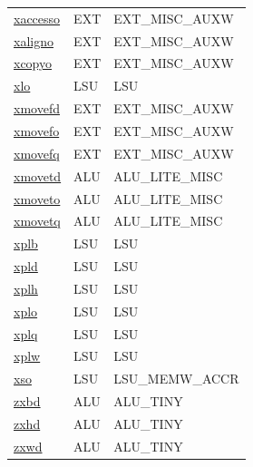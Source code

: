 \begin{small}
\begin{longtable}[l]{l l l}
\hyperlink{lvx.xaccesso}{xaccesso} & EXT & EXT\_MISC\_AUXW \\ 
\hyperlink{lvx.xaligno}{xaligno} & EXT & EXT\_MISC\_AUXW \\ 
\hyperlink{lvx.xcopyo}{xcopyo} & EXT & EXT\_MISC\_AUXW \\ 
\hyperlink{lvx.xlo}{xlo} & LSU & LSU \\ 
\hyperlink{lvx.xmovefd}{xmovefd} & EXT & EXT\_MISC\_AUXW \\ 
\hyperlink{lvx.xmovefo}{xmovefo} & EXT & EXT\_MISC\_AUXW \\ 
\hyperlink{lvx.xmovefq}{xmovefq} & EXT & EXT\_MISC\_AUXW \\ 
\hyperlink{lvx.xmovetd}{xmovetd} & ALU & ALU\_LITE\_MISC \\ 
\hyperlink{lvx.xmoveto}{xmoveto} & ALU & ALU\_LITE\_MISC \\ 
\hyperlink{lvx.xmovetq}{xmovetq} & ALU & ALU\_LITE\_MISC \\ 
\hyperlink{lvx.xplb}{xplb} & LSU & LSU \\ 
\hyperlink{lvx.xpld}{xpld} & LSU & LSU \\ 
\hyperlink{lvx.xplh}{xplh} & LSU & LSU \\ 
\hyperlink{lvx.xplo}{xplo} & LSU & LSU \\ 
\hyperlink{lvx.xplq}{xplq} & LSU & LSU \\ 
\hyperlink{lvx.xplw}{xplw} & LSU & LSU \\ 
\hyperlink{lvx.xso}{xso} & LSU & LSU\_MEMW\_ACCR \\ 
\hyperlink{lvx.zxbd}{zxbd} & ALU & ALU\_TINY \\ 
\hyperlink{lvx.zxhd}{zxhd} & ALU & ALU\_TINY \\ 
\hyperlink{lvx.zxwd}{zxwd} & ALU & ALU\_TINY \\ 
\end{longtable}\end{small}
